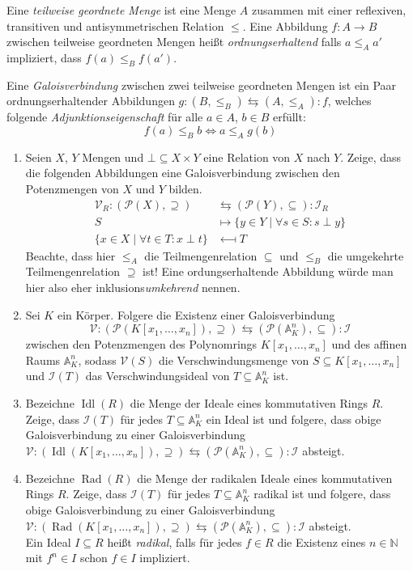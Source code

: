 \documentclass{latex-uebungsblatt/uebungsblatt}
\DeclareMathOperator{\Idl}{Idl}
\DeclareMathOperator{\Rad}{Rad}
\begin{document}

Eine \emph{teilweise geordnete Menge} ist eine Menge $A$ zusammen mit einer reflexiven, transitiven und antisymmetrischen Relation $≤$.
Eine Abbildung $f:A → B$ zwischen teilweise geordneten Mengen heißt \emph{ordnungserhaltend} falls $a ≤_A a'$ impliziert, dass $f(a) ≤_B f(a')$.

\begin{exercise}[Galoisverbindungen]
  Eine \emph{Galoisverbindung} zwischen zwei teilweise geordneten Mengen ist ein Paar ordnungserhaltender Abbildungen $g:(B,≤_B) ⇆ (A,≤_A):f$, welches folgende \emph{Adjunktionseigenschaft} für alle $a ∈ A$, $b ∈ B$ erfüllt:
  $$
  f(a) ≤_B b ⇔ a ≤_A g(b)
  $$
  \begin{enumerate}
    \item Seien $X$, $Y$ Mengen und $⊥ ⊆ X × Y$ eine Relation von $X$ nach $Y$.
      Zeige, dass die folgenden Abbildungen eine Galoisverbindung zwischen den Potenzmengen von $X$ und $Y$ bilden.
      \begin{align*}
        𝒱_R : (𝒫(X),⊇) &\leftrightarrows (𝒫(Y),⊆) : ℐ_R\\
        S & \longmapsto \{y ∈ Y \mid ∀s ∈ S:s \perp y\}\\
        \{x ∈ X \mid ∀t ∈ T:x \perp t\} & \longmapsfrom T
      \end{align*}
      {\scriptsize Beachte, dass hier $≤_A$ die Teilmengenrelation $⊆$ und $≤_B$ die umgekehrte Teilmengenrelation $⊇$ ist!
      Eine ordungserhaltende Abbildung würde man hier also eher inklusions\emph{umkehrend} nennen.}
    \item Sei $K$ ein Körper.
      Folgere die Existenz einer Galoisverbindung
      $$
      𝒱:(𝒫(K[x_1,\dots,x_n]),⊇) ⇆ (𝒫(𝔸^n_K),⊆):ℐ
      $$
      zwischen den Potenzmengen des Polynomrings $K[x_1,\dots,x_n]$ und des affinen Raums $𝔸^n_K$, sodass $𝒱(S)$ die Verschwindungsmenge von $S⊆K[x_1,\dots,x_n]$ und $ℐ(T)$ das Verschwindungsideal von $T⊆𝔸^n_K$ ist.
    \item Bezeichne $\Idl(R)$ die Menge der Ideale eines kommutativen Rings $R$.
      Zeige, dass $ℐ(T)$ für jedes $T⊆𝔸^n_K$ ein Ideal ist und folgere, dass obige Galoisverbindung zu einer Galoisverbindung $𝒱:(\Idl(K[x_1,\dots,x_n]),⊇) ⇆ (𝒫(𝔸^n_K),⊆):ℐ$ absteigt.
    \item Bezeichne $\Rad(R)$ die Menge der radikalen Ideale eines kommutativen Rings $R$.
    Zeige, dass $ℐ(T)$ für jedes $T⊆𝔸^n_K$ radikal ist und folgere, dass obige Galoisverbindung zu einer Galoisverbindung $𝒱:(\Rad(K[x_1,\dots,x_n]),⊇) ⇆ (𝒫(𝔸^n_K),⊆):ℐ$ absteigt.\\
      {\scriptsize Ein Ideal $I⊆R$ heißt \emph{radikal}, falls für jedes $f ∈ R$ die Existenz eines $n ∈ ℕ$ mit $f^n ∈ I$ schon $f ∈ I$ impliziert.}
  \end{enumerate}
\end{exercise}
\end{document}
